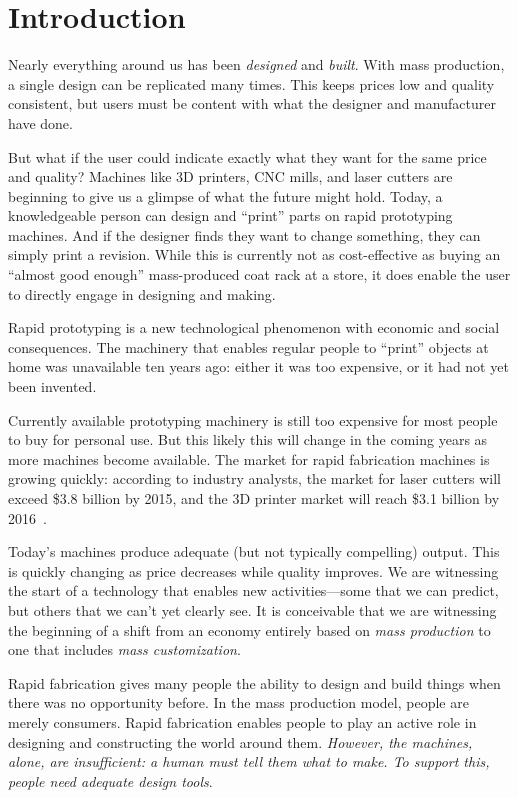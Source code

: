 \chapter{Introduction}

Nearly everything around us has been \textit{designed} and
\textit{built}. With mass production, a single design can be
replicated many times. This keeps prices low and quality consistent,
but users must be content with what the designer and manufacturer have
done.

But what if the user could indicate exactly what they want for the
same price and quality? Machines like 3D printers, CNC mills, and
laser cutters are beginning to give us a glimpse of what the future
might hold. Today, a knowledgeable person can design and ``print''
parts on rapid prototyping machines. And if the designer finds they
want to change something, they can simply print a revision. While this
is currently not as cost-effective as buying an ``almost good enough''
mass-produced coat rack at a store, it does enable the user to
directly engage in designing and making.

Rapid prototyping is a new technological phenomenon with economic and
social consequences. The machinery that enables regular people to
``print'' objects at home was unavailable ten years ago: either it was
too expensive, or it had not yet been invented. 

Currently available prototyping machinery is still too expensive for
most people to buy for personal use. But this likely this will change
in the coming years as more machines become available. The market for
rapid fabrication machines is growing quickly: according to industry
analysts, the market for laser cutters will exceed \$3.8 billion by
2015, and the 3D printer market will reach \$3.1 billion by
2016~\cite{laser-cutter-market,3d-printer-market}.

Today's machines produce adequate (but not typically compelling)
output. This is quickly changing as price decreases while quality
improves. We are witnessing the start of a technology that enables new
activities---some that we can predict, but others that we can't yet
clearly see. It is conceivable that we are witnessing the beginning of
a shift from an economy entirely based on \textit{mass production} to
one that includes \textit{mass customization}.

Rapid fabrication gives many people the ability to design and build
things when there was no opportunity before. In the mass production
model, people are merely consumers. Rapid fabrication enables people
to play an active role in designing and constructing the world around
them. \textit{However, the machines, alone, are insufficient: a human
  must tell them what to make. To support this, people need adequate
  design tools}.

